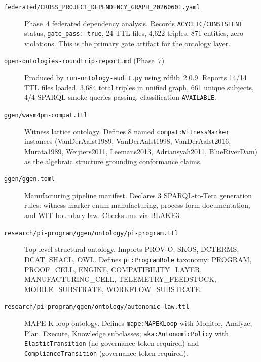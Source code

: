 \begin{description}
  \item[\texttt{federated/CROSS\_PROJECT\_DEPENDENCY\_GRAPH\_20260601.yaml}]
        Phase~4 federated dependency analysis. Records \texttt{ACYCLIC}/\texttt{CONSISTENT}
        status, \texttt{gate\_pass: true}, 24 TTL files, 4{,}622 triples, 871 entities, zero
        violations. This is the primary gate artifact for the ontology layer.

  \item[\texttt{open-ontologies-roundtrip-report.md} (Phase~7)]
        Produced by \texttt{run-ontology-audit.py} using rdflib~2.0.9. Reports 14/14 TTL
        files loaded, 3{,}684 total triples in unified graph, 661 unique subjects, 4/4 SPARQL
        smoke queries passing, classification \texttt{AVAILABLE}.

  \item[\texttt{ggen/wasm4pm-compat.ttl}]
        Witness lattice ontology. Defines 8 named \texttt{compat:WitnessMarker} instances
        (VanDerAalst1989, VanDerAalst1998, VanDerAalst2016, Murata1989, Weijters2011,
        Leemans2013, Adriansyah2011, BlueRiverDam) as the algebraic structure grounding
        conformance claims.

  \item[\texttt{ggen/ggen.toml}]
        Manufacturing pipeline manifest. Declares 3 SPARQL-to-Tera generation rules:
        witness marker enum manufacturing, process form documentation, and WIT boundary
        law. Checksums via BLAKE3.

  \item[\texttt{research/pi-program/ggen/ontology/pi-program.ttl}]
        Top-level structural ontology. Imports PROV-O, SKOS, DCTERMS, DCAT, SHACL, OWL.
        Defines \texttt{pi:ProgramRole} taxonomy: PROGRAM, PROOF\_CELL, ENGINE,
        COMPATIBILITY\_LAYER, MANUFACTURING\_CELL, TELEMETRY\_FEEDSTOCK,
        MOBILE\_SUBSTRATE, WORKFLOW\_SUBSTRATE.

  \item[\texttt{research/pi-program/ggen/ontology/autonomic-law.ttl}]
        MAPE-K loop ontology. Defines \texttt{mape:MAPEKLoop} with Monitor, Analyze, Plan,
        Execute, Knowledge subclasses; \texttt{aka:AutonomicPolicy} with
        \texttt{ElasticTransition} (no governance token required) and
        \texttt{ComplianceTransition} (governance token required).
\end{description}
